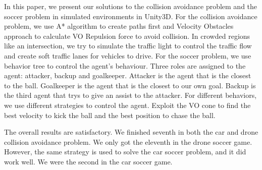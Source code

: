 \documentclass[a4paper,12pt]{article}
\begin{document}
In this paper, we present our solutions to the collision avoidance problem and the soccer problem in simulated environments in Unity3D. 
For the collision avoidance problem, we use A* algorithm to create paths first and Velocity Obstacles approach to calculate VO Repulsion force to avoid collision.
In crowded regions like an intersection, we try to simulate the traffic light to control the traffic flow and create soft traffic lanes for vehicles to drive.
For the soccer problem, we use behavior tree to control the agent's behaviour. 
Three roles are assigned to the agent: attacker, backup and goalkeeper. Attacker is the agent that is the closest to the ball. Goalkeeper is the agent that is the closest to our own goal. Backup is the third agent that trys to give an assist to the attacker.
For different behaviors, we use different strategies to control the agent.
Exploit the VO cone to find the best velocity to kick the ball and the best position to chase the ball. 

The overall results are satisfactory. We finished seventh in both the car and drone collision avoidance problem.
We only got the eleventh in the drone soccer game. However, the same strategy is used to solve the car soccer problem, and it did work well.
We were the second in the car soccer game.







\end{document}
